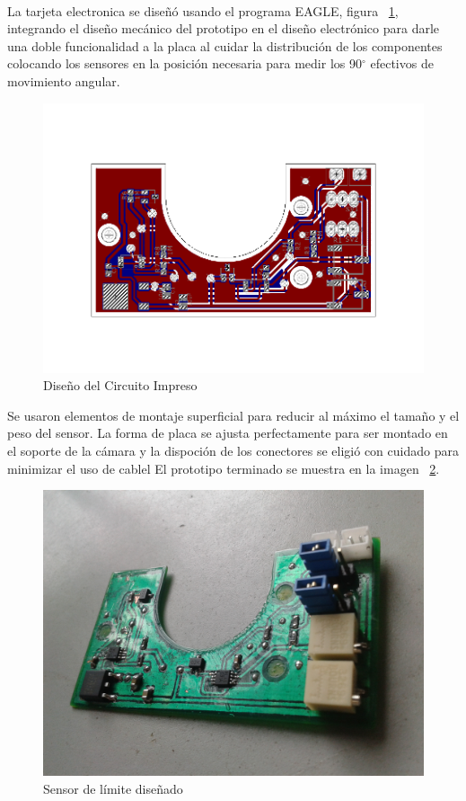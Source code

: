 La tarjeta electronica se dise\~{n}\'{o} usando el programa EAGLE\textsuperscript{\textregistered}, figura ~\ref{fig:CircuitoImp}, integrando el dise\~{n}o mec\'{a}nico del prototipo en el dise\~{n}o electr\'{o}nico para darle una doble funcionalidad a la placa al cuidar la distribuci\'{o}n de los componentes colocando los sensores en la posici\'{o}n necesaria para medir los 90$^\circ$ efectivos de movimiento angular.

\begin{figure}[H]
\centering \includegraphics[scale=0.75,trim = 0mm 25mm 0mm 20mm]{img/LimitSW_Tilt_DW_UP.pdf}
\caption{Dise\~{n}o del Circuito Impreso}
\label{fig:CircuitoImp}
\end{figure} 

Se usaron elementos de montaje superficial para reducir al m\'{a}ximo el tama\~{n}o y el peso del sensor. La forma de placa se ajusta perfectamente para ser montado en el soporte de la c\'{a}mara y la dispoci\'{o}n de los conectores se eligi\'{o} con cuidado para minimizar el uso de cablel El prototipo terminado se muestra en la imagen ~\ref{fig:SenTilt}.

\begin{figure}[H]
\centering \includegraphics[scale=0.093]{img/SenTilt.jpg}
\caption{Sensor de l\'{i}mite dise\~{n}ado}
\label{fig:SenTilt}
\end{figure} 


